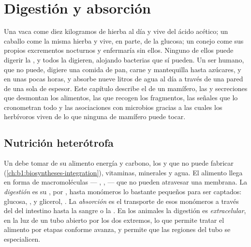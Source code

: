 \chapter{Digestión y absorción}\label{ch:b1:digestion-absorption}

Una vaca come diez kilogramos de hierba al día y vive del ácido acético; un
caballo come la misma hierba y vive, en parte, de la glucosa; un conejo come
sus propios excrementos nocturnos y enfermaría sin ellos. Ninguno de ellos
puede digerir la , y todos la digieren, alojando bacterias que sí
pueden. Un ser humano, que no puede, digiere una comida de pan, carne y
mantequilla hasta azúcares,  y  en unas pocas horas,
y absorbe nueve litros de agua al día a través de una pared de una sola
 de espesor. Este capítulo describe el  de un mamífero,
las  y secreciones que desmontan los alimentos, las  que
recogen los fragmentos, las señales que lo cronometran todo y las
asociaciones con microbios gracias a las cuales los herbívoros viven de lo
que ninguna  de mamífero puede tocar.

\section{Nutrición heterótrofa}

\begin{definition}\label{def:b1:digestion-absorption:nutrition}
Un  debe tomar de su alimento energía y carbono, los 
y  que no puede fabricar
(\cref{ch:b1:biosyntheses-integration}), vitaminas, minerales y agua. El
alimento llega en forma de macromoléculas --- , ,  ---
que no pueden atravesar una membrana. La \emph{digestión} es su ,
por , hasta monómeros lo bastante pequeños para ser captados:
glucosa, ,  y glicerol, . La
\emph{absorción} es el transporte de esos monómeros a través del 
del intestino hasta la sangre o la . En los animales la digestión es
\emph{extracelular}, en la luz de un tubo abierto por los dos extremos, lo
que permite tratar el alimento por etapas conforme avanza, y permite que las
regiones del tubo se especialicen.
\end{definition}

